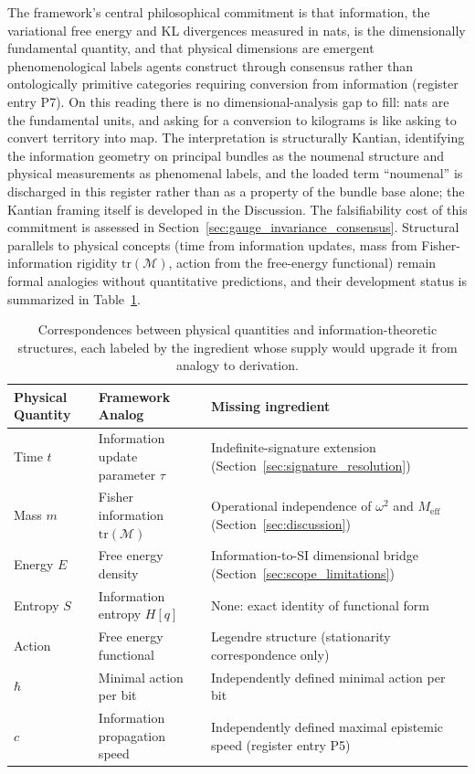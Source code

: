\documentclass[11pt]{article}
\begin{document}
The framework's central philosophical commitment is that information, the variational free energy and KL divergences measured in nats, is the dimensionally fundamental quantity, and that physical dimensions are emergent phenomenological labels agents construct through consensus rather than ontologically primitive categories requiring conversion from information (register entry P7). On this reading there is no dimensional-analysis gap to fill: nats are the fundamental units, and asking for a conversion to kilograms is like asking to convert territory into map. The interpretation is structurally Kantian, identifying the information geometry on principal bundles as the noumenal structure and physical measurements as phenomenal labels, and the loaded term ``noumenal'' is discharged in this register rather than as a property of the bundle base alone; the Kantian framing itself is developed in the Discussion. The falsifiability cost of this commitment is assessed in Section~\ref{sec:gauge_invariance_consensus}. Structural parallels to physical concepts (time from information updates, mass from Fisher-information rigidity $\mathrm{tr}(\mathcal{M})$, action from the free-energy functional) remain formal analogies without quantitative predictions, and their development status is summarized in Table~\ref{tab:physical_correspondences}.

\begin{table}[h]
\centering
\begin{tabularx}{\linewidth}{|l|X|X|}
\hline
\textbf{Physical Quantity} & \textbf{Framework Analog} & \textbf{Missing ingredient} \\
\hline
Time $t$ & Information update parameter $\tau$ & Indefinite-signature extension (Section~\ref{sec:signature_resolution}) \\
Mass $m$ & Fisher information $\mathrm{tr}(\mathcal{M})$ & Operational independence of $\omega^2$ and $M_{\mathrm{eff}}$ (Section~\ref{sec:discussion}) \\
Energy $E$ & Free energy density & Information-to-SI dimensional bridge (Section~\ref{sec:scope_limitations}) \\
Entropy $S$ & Information entropy $H[q]$ & None: exact identity of functional form \\
Action & Free energy functional & Legendre structure (stationarity correspondence only) \\
$\hbar$ & Minimal action per bit & Independently defined minimal action per bit \\
$c$ & Information propagation speed & Independently defined maximal epistemic speed (register entry P5) \\
\hline
\end{tabularx}
\caption{Correspondences between physical quantities and information-theoretic structures, each labeled by the ingredient whose supply would upgrade it from analogy to derivation.}
\label{tab:physical_correspondences}
\end{table}
\end{document}
